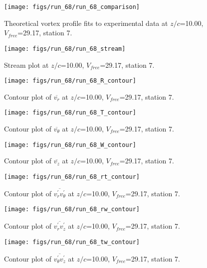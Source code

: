 \begin{figure}[H]
\centering
\texttt{[image: figs/run\_68/run\_68\_comparison]}
\caption{Theoretical vortex profile fits to experimental data at $z/c$=10.00, $V_{free}$=29.17, station 7.}
\end{figure}


\begin{figure}[H]
\centering
\texttt{[image: figs/run\_68/run\_68\_stream]}
\caption{Stream plot at $z/c$=10.00, $V_{free}$=29.17, station 7.}
\end{figure}


\begin{figure}[H]
\centering
\texttt{[image: figs/run\_68/run\_68\_R\_contour]}
\caption{Contour plot of $\overline{v_{r}}$ at $z/c$=10.00, $V_{free}$=29.17, station 7.}
\end{figure}


\begin{figure}[H]
\centering
\texttt{[image: figs/run\_68/run\_68\_T\_contour]}
\caption{Contour plot of $\overline{v_{\theta}}$ at $z/c$=10.00, $V_{free}$=29.17, station 7.}
\end{figure}


\begin{figure}[H]
\centering
\texttt{[image: figs/run\_68/run\_68\_W\_contour]}
\caption{Contour plot of $\overline{v_{z}}$ at $z/c$=10.00, $V_{free}$=29.17, station 7.}
\end{figure}


\begin{figure}[H]
\centering
\texttt{[image: figs/run\_68/run\_68\_rt\_contour]}
\caption{Contour plot of $\overline{v_{r}^{\prime} v_{\theta}^{\prime}}$ at $z/c$=10.00, $V_{free}$=29.17, station 7.}
\end{figure}


\begin{figure}[H]
\centering
\texttt{[image: figs/run\_68/run\_68\_rw\_contour]}
\caption{Contour plot of $\overline{v_{r}^{\prime} v_{z}^{\prime}}$ at $z/c$=10.00, $V_{free}$=29.17, station 7.}
\end{figure}


\begin{figure}[H]
\centering
\texttt{[image: figs/run\_68/run\_68\_tw\_contour]}
\caption{Contour plot of $\overline{v_{\theta}^{\prime} v_{z}^{\prime}}$ at $z/c$=10.00, $V_{free}$=29.17, station 7.}
\end{figure}


